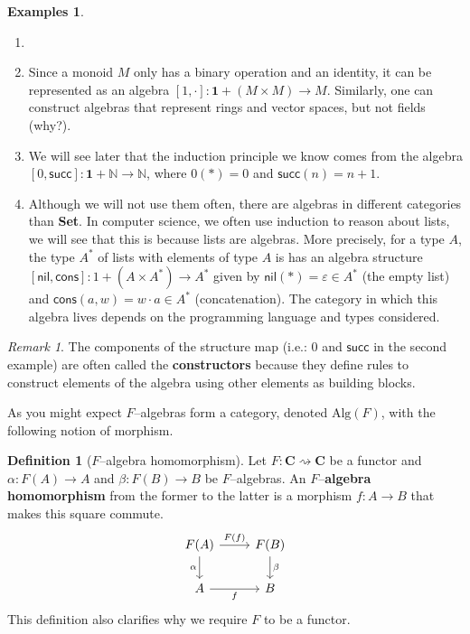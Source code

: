 \documentclass{article}
\theoremstyle{definition}
\newtheorem{defn}[thm]{Definition}
\newtheorem{exmps}[thm]{Examples}
\theoremstyle{remark}
\newtheorem{rem}[thm]{Remark}
\newcommand{\N}{\mathbb{N}}
\renewcommand{\succ}{\textsf{succ}}
\begin{document}
\begin{exmps}
	\begin{enumerate}
		\item[]
		\item Since a monoid $M$ only has a binary operation and an identity, it can be represented as an algebra $[1,\cdot] : \mathbf{1} + (M\times M) \rightarrow M$. Similarly, one can construct algebras that represent rings and vector spaces, but not fields (why?).
		\item We will see later that the induction principle we know comes from the algebra $[0,\succ]: \mathbf{1} + \N \rightarrow \N$, where $0(\ast) = 0$ and $\succ(n) = n+1$.
		\item Although we will not use them often, there are algebras in different categories than \textbf{Set}. In computer science, we often use induction to reason about lists, we will see that this is because lists are algebras. More precisely, for a type $A$, the type $A^*$ of lists with elements of type $A$ is has an algebra structure $[\textsf{nil}, \textsf{cons}]: 1+ (A\times A^*) \rightarrow A^*$ given by $\textsf{nil}(*) = \varepsilon \in A^*$ (the empty list) and $\textsf{cons}(a, w) = w\cdot a \in A^*$ (concatenation). The category in which this algebra lives depends on the programming language and types considered.
	\end{enumerate}
\end{exmps}
\begin{rem}
	The components of the structure map (i.e.: $0$ and $\succ$ in the second example) are often called the \textbf{constructors} because they define rules to construct elements of the algebra using other elements as building blocks.
\end{rem}
As you might expect $F$--algebras form a category, denoted $\text{Alg}(F)$, with the following notion of morphism.
\begin{defn}[$F$--algebra homomorphism]\label{alghom}
	Let $F:\mathbf{C}\rightsquigarrow \mathbf{C}$ be a functor and $\alpha: F(A) \rightarrow A$ and $\beta:F(B) \rightarrow B$ be $F$--algebras. An $F$--\textbf{algebra homomorphism} from the former to the latter is a morphism $f:A\rightarrow B$ that makes this square commute.
	\begin{equation}\label{diag-alghom}
		\begin{tikzcd}
			F(A) \arrow[d, "\alpha"'] \arrow[r, "F(f)"] & F(B) \arrow[d, "\beta"] \\
			A \arrow[r, "f"']                           & B                       
		\end{tikzcd}
	\end{equation}
	This definition also clarifies why we require $F$ to be a functor.
\end{defn}
\end{document}
